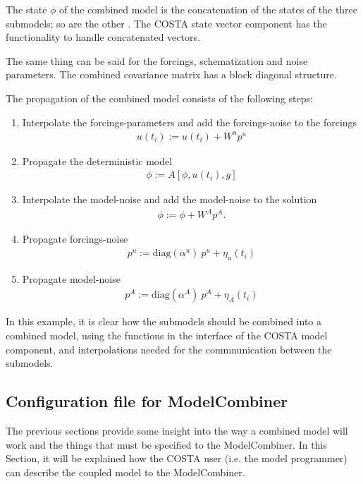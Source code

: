 \documentclass[a4paper,12pt]{article}
\begin{document}
The state $\phi$ of the combined model is the concatenation of the 
states of the three submodels; so are the other . The COSTA state vector 
component has the functionality to handle concatenated vectors.

The same thing can be said for the forcings, schematization and 
noise parameters. The combined covariance matrix has a block diagonal
structure.

The propagation of the combined model consists of the following steps:
\begin{enumerate}
 \item Interpolate the forcings-parameters and add the forcings-noise to
       the forcings
    \begin{eqnarray}
       u(t_i) := u(t_i) + W^u p^u
    \end{eqnarray}
 \item Propagate the deterministic model
    \begin{eqnarray}
       \phi := A[\phi,u(t_i),g]
    \end{eqnarray}
 \item Interpolate the model-noise and add the model-noise to the solution 
    \begin{eqnarray}
       \phi := \phi + W^A p^A. 
    \end{eqnarray}
 \item Propagate forcings-noise
    \begin{eqnarray}
       p^u := \mbox{diag}(\alpha^u)~p^u + \eta_u(t_i)
    \end{eqnarray}
 \item Propagate model-noise
    \begin{eqnarray}
       p^A := \mbox{diag}(\alpha^A)~p^A + \eta_A(t_i)
    \end{eqnarray}
\end{enumerate}
In this example, it is clear how the submodels should be combined into a 
combined model, using the functions in the interface of the COSTA model
component, and interpolations needed for the commnunication between the
submodels.


\subsection{Configuration file for ModelCombiner}
\label{Sec: usage}
The previous sections provide some insight into the way a combined 
model will work and the things that must be specified to the ModelCombiner.
In this Section, it will be explained how the COSTA user (i.e. the model 
programmer) can describe the coupled model to the ModelCombiner.
\end{document}

